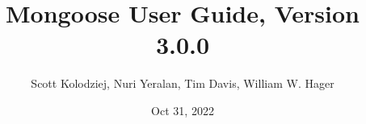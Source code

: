 \title{Mongoose User Guide, Version 3.0.0}
\author{Scott Kolodziej, Nuri Yeralan, Tim Davis, William W. Hager}
\date{Oct 31, 2022}
